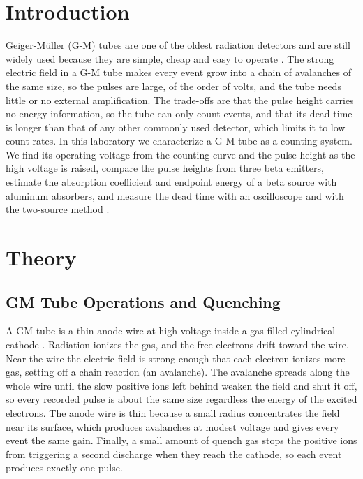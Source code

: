 \documentclass[12pt]{article}
\begin{document}
\tableofcontents

\newpage

\begin{abstract}

{}



\end{abstract}


\section{Introduction}

Geiger-M\"uller (G-M) tubes are one of the oldest radiation detectors and are still widely used because they are simple, cheap and easy to operate \cite{knoll}. The strong electric field in a G-M tube makes every event grow into a chain of avalanches of the same size, so the pulses are large, of the order of volts, and the tube needs little or no external amplification. The trade-offs are that the pulse height carries no energy information, so the tube can only count events, and that its dead time is longer than that of any other commonly used detector, which limits it to low count rates. In this laboratory we characterize a G-M tube as a counting system. We find its operating voltage from the counting curve and the pulse height as the high voltage is raised, compare the pulse heights from three beta emitters, estimate the absorption coefficient and endpoint energy of a beta source with aluminum absorbers, and measure the dead time with an oscilloscope and with the two-source method \cite{labmanual}.

\section{Theory}
\label{sec:theory}

\subsection{GM Tube Operations and Quenching}
\label{subsec:background}

A GM tube is a thin anode wire at high voltage inside a gas-filled cylindrical cathode \cite{knoll}. Radiation ionizes the gas, and the free electrons drift toward the wire. Near the wire the electric field is strong enough that each electron ionizes more gas, setting off a chain reaction (an avalanche). The avalanche spreads along the whole wire until the slow positive ions left behind weaken the field and shut it off, so every recorded pulse is about the same size regardless the energy of the excited electrons. The anode wire is thin because a small radius concentrates the field near its surface, which produces avalanches at modest voltage and gives every event the same gain. Finally, a small amount of quench gas stops the positive ions from triggering a second discharge when they reach the cathode, so each event produces exactly one pulse.
\end{document}
